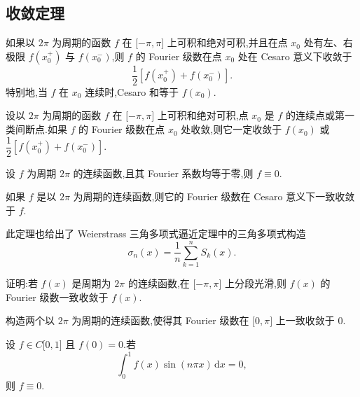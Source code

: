 \documentclass[../数学分析培优讲义.tex]{subfiles}
\begin{document}
\newpage

\subsection{收敛定理}

\begin{theorem}[Fejer 定理 $*$]
如果以 $2\pi$ 为周期的函数 $f$ 在 $\lbrack -\pi,\pi\rbrack$ 上可积和绝对可积,并且在点 $x_0$ 处有左、右极限 $f(x_0^+)$ 与 $f(x_0^-)$,则 $f$ 的 Fourier 级数在点 $x_0$ 处在 Cesaro 意义下收敛于
\[
    \dfrac{1}{2}[f(x_0^+)+f(x_0^-)].
\]
特别地,当 $f$ 在 $x_0$ 连续时,Cesaro 和等于 $f(x_0)$.
\end{theorem}

\begin{theorem}[\markstar]
设以 $2\pi$ 为周期的函数 $f$ 在 $\lbrack -\pi,\pi\rbrack$ 上可积和绝对可积,点 $x_0$ 是 $f$ 的连续点或第一类间断点.如果 $f$ 的 Fourier 级数在点 $x_0$ 处收敛,则它一定收敛于 $f(x_0)$ 或 $\dfrac{1}{2}[f(x_0^+)+f(x_0^-)]$.
\end{theorem}

\begin{theorem}
设 $f$ 为周期 $2\pi$ 的连续函数,且其 Fourier 系数均等于零,则 $f\equiv0$.
\end{theorem}

\begin{theorem}[$*$]
如果 $f$ 是以 $2\pi$ 为周期的连续函数,则它的 Fourier 级数在 Cesaro 意义下一致收敛于 $f$.
\end{theorem}

\begin{remark}
此定理也给出了 Weierstrass 三角多项式逼近定理中的三角多项式构造
\[
    \sigma_n(x)=\dfrac{1}{n}\sum\limits_{k=1}^{n}S_k(x).
\]
\end{remark}

\begin{example}
证明:若 $f(x)$ 是周期为 $2\pi$ 的连续函数,在 $\lbrack -\pi,\pi\rbrack$ 上分段光滑,则 $f(x)$ 的 Fourier 级数一致收敛于 $f(x)$.
\end{example}
\exampleblank

\begin{example}
构造两个以 $2\pi$ 为周期的连续函数,使得其 Fourier 级数在 $\lbrack 0,\pi\rbrack$ 上一致收敛于 $0$.
\end{example}
\exampleblank

\begin{example}
设 $f\in C\lbrack 0,1\rbrack$ 且 $f(0)=0$.若
\[
    \int_0^1f(x)\sin(n\pi x)\,\mathrm{d}x=0,
\]
则 $f\equiv0$.
\end{example}
\exampleblank
\end{document}
